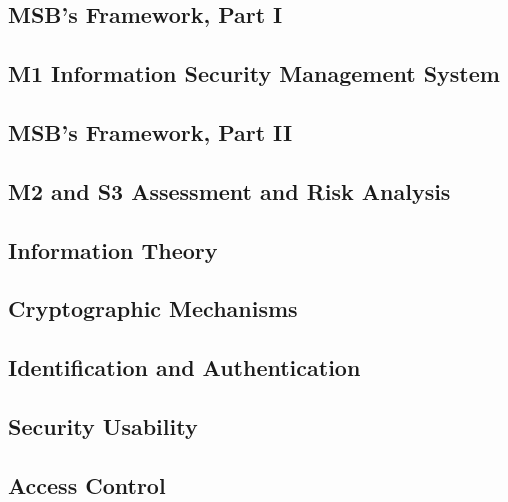 \subsection{MSB's Framework, Part I}


\subsection{M1 Information Security Management System}


\subsection{MSB's Framework, Part II}


\subsection{M2 and S3 Assessment and Risk Analysis}


\subsection{Information Theory}


\subsection{Cryptographic Mechanisms}


\subsection{Identification and Authentication}


\subsection{Security Usability}


\subsection{Access Control}


%


